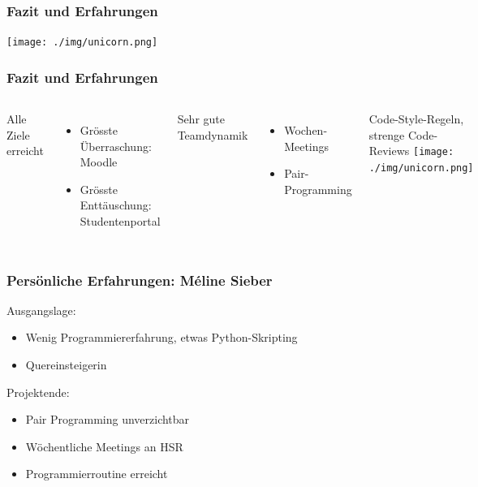 \documentclass{beamer}
\begin{document}
	\begin{frame}
	\frametitle{Fazit und Erfahrungen}
	\begin{center}
	\texttt{[image: ./img/unicorn.png]}
	\end{center}
	\end{frame}
	
	\begin{frame}
		\frametitle{Fazit und Erfahrungen}
		\begin{columns}
			Alle Ziele erreicht
				\begin{itemize}
					    \item Grösste Überraschung: Moodle
					    \item Grösste Enttäuschung: Studentenportal
				\end{itemize}
			Sehr gute Teamdynamik
			\begin{itemize}
				\item Wochen-Meetings	
				\item Pair-Programming
			\end{itemize}
			Code-Style-Regeln, strenge Code-Reviews
			\texttt{[image: ./img/unicorn.png]}
		\end{columns}
	\end{frame}

	\begin{frame}
	  	\frametitle{Persönliche Erfahrungen: Méline Sieber}
	  	Ausgangslage: 
		\begin{itemize}
			\item Wenig Programmiererfahrung, etwas Python-Skripting
			\item Quereinsteigerin
		\end{itemize}
		\pause
		Projektende:
			\begin{itemize}
				\item Pair Programming unverzichtbar
				\item Wöchentliche Meetings an HSR
				\item Programmierroutine erreicht
			\end{itemize}
	\end{frame}
	
\end{document}
